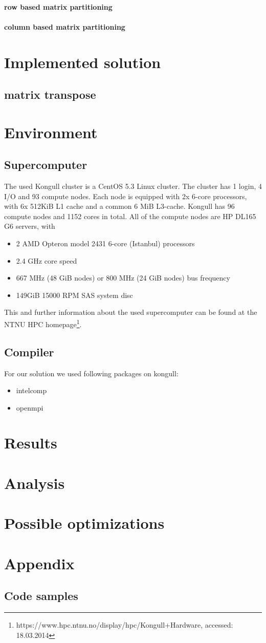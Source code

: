 \documentclass{article}
\begin{document}
\paragraph{row based matrix partitioning}
\paragraph{column based matrix partitioning}
\section{Implemented solution}
\subsection{matrix transpose}
\section{Environment}
\subsection{Supercomputer}
The used Kongull cluster is a CentOS 5.3 Linux cluster. The cluster has 1 login, 4 I/O and 93 compute nodes. Each node is equipped with 2x 6-core processors, with 6x 512KiB L1 cache and a common 6 MiB L3-cache. Kongull has 96 compute nodes and 1152 cores in total. All of the compute nodes are HP DL165 G6 servers, with
\begin{itemize}
\item 2 AMD Opteron model 2431 6-core (Istanbul) processors
\item 2.4 GHz core speed
\item 667 MHz (48 GiB nodes) or 800 MHz (24 GiB nodes) bus frequency
\item 149GiB 15000 RPM SAS system disc
\end{itemize}
This and further information about the used supercomputer can be found at the NTNU HPC homepage\footnote{https://www.hpc.ntnu.no/display/hpc/Kongull+Hardware, accessed: 18.03.2014}.
\subsection{Compiler}

For our solution we used following packages on kongull:
\begin{itemize}
\item intelcomp
\item openmpi
\end{itemize}
\section{Results}

\section{Analysis}

\section{Possible optimizations}

\section{Appendix}
\subsection{Code samples}
\end{document}
